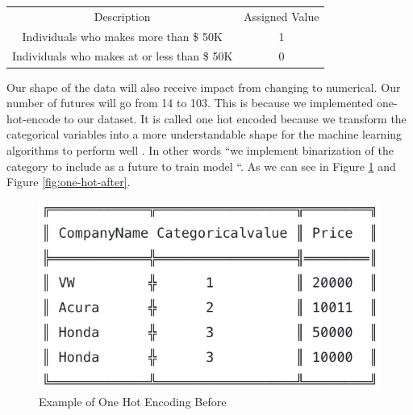 \documentclass[sigconf]{acmart}
\begin{document}
\begin{center}
\begin{tabular}{ |c|c| } 
 \hline
 Description & Assigned Value  \\ 
Individuals who makes more than \$ 50K  & 1  \\ 
Individuals who makes at or less than \$ 50K & 0  \\ 
 \hline
\end{tabular}
\end{center}

\par Our shape of the data will also receive impact from changing to numerical. Our number of futures will go from 14 to 103. This is because we implemented one-hot-encode to our dataset. It is called one hot encoded because we transform the categorical variables into a more understandable shape for the machine learning algorithms to perform well \cite{www-hackernoon}. In other words ``we implement binarization of the category to include as a future to train model \cite{www-hackernoon}``. As we can see in Figure \ref{fig:one-hot-before} and Figure \ref{fig:one-hot-after}.

 \begin{figure}[!ht]
  \centering
      \includegraphics[width=\columnwidth]{project/images/one-hot-before.png}
  \caption{Example of One Hot Encoding Before \cite{www-hackernoon}}\label{fig:one-hot-before}
\end{figure}
\end{document}
